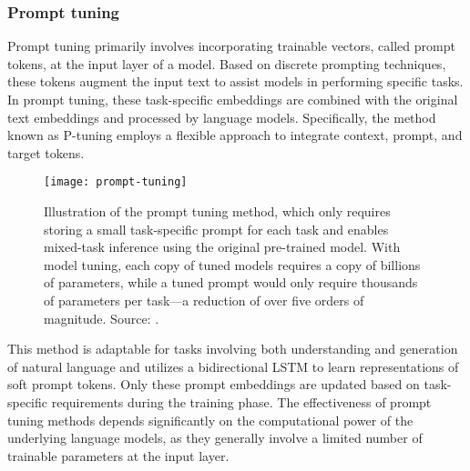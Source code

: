 \subsubsection{Prompt tuning}
\label{subsubsec:prompt-tuning}

Prompt tuning primarily involves incorporating trainable vectors, called prompt tokens, at the input layer of a model.
Based on discrete prompting techniques, these tokens augment the input text to assist models in performing specific tasks.
In prompt tuning, these task-specific embeddings are combined with the original text embeddings and processed by language models.
Specifically, the method known as P-tuning employs a flexible approach to integrate context, prompt, and target tokens.
\begin{figure}[h!]
	\centering
	\texttt{[image: prompt-tuning]}
	\caption{Illustration of the prompt tuning method, which only requires storing a small task-specific prompt for each task and enables mixed-task inference using the original pre-trained model. With model tuning, each copy of tuned models requires a copy of billions of parameters, while a tuned prompt would only require thousands of parameters per task---a reduction of over five orders of magnitude. Source: \textcite{lester2021power}.}
	\label{fig:prompt-tuning}
\end{figure}
This method is adaptable for tasks involving both understanding and generation of natural language and utilizes a bidirectional LSTM to learn representations of soft prompt tokens.
Only these prompt embeddings are updated based on task-specific requirements during the training phase.
The effectiveness of prompt tuning methods depends significantly on the computational power of the underlying language models, as they generally involve a limited number of trainable parameters at the input layer.

